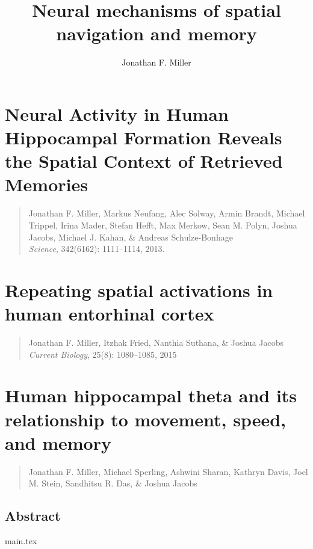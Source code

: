 \documentclass[final,subfig,blackref,approvalform]{drexel-thesis} %
\author{Jonathan F. Miller}
\title{Neural mechanisms of spatial navigation and memory}
\begin{document}


\begin{thesis}
  
    

    \chapter{Neural Activity in Human Hippocampal Formation Reveals the Spatial Context of Retrieved Memories}
    \begin{quotation}
    \singlespacing
    \noindent Jonathan F. Miller, Markus Neufang, Alec Solway, Armin Brandt, Michael Trippel, Irina Mader, Stefan Hefft, Max Merkow, Sean M.  Polyn, Joshua Jacobs, Michael J. Kahan, \& Andreas Schulze-Bonhage  \\ \textit{Science}, 342(6162): 1111--1114, 2013.
    \end{quotation}
    

    \chapter{Repeating spatial activations in human entorhinal cortex}
    \begin{quotation}
    \singlespacing
    \noindent Jonathan F. Miller, Itzhak Fried, Nanthia Suthana, \& Joshua Jacobs \\ \textit{Current Biology}, 25(8): 1080--1085, 2015
    \end{quotation}
    
	
    \chapter{Human hippocampal theta and its relationship to movement, speed, and memory}
    \begin{quotation}
    \singlespacing
    \noindent Jonathan F. Miller, Michael Sperling, Ashwini Sharan, Kathryn Davis, Joel M. Stein, Sandhitsu R. Das, \& Joshua Jacobs \\ %
    \end{quotation}	

    \section{Abstract}
    
    {main.tex}
    

    


  
\end{thesis}

 


% 
% 
\end{document}
